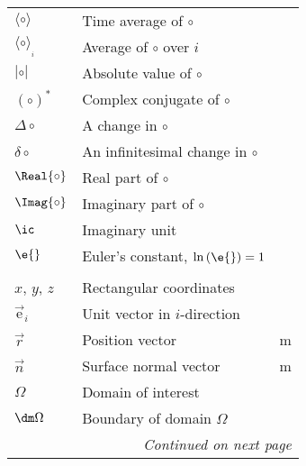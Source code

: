 \begin{center}
\begin{tabular}{p{2cm}p{8cm}p{3cm}}
$\langle\circ\rangle$       & Time average of $\circ$						& \SI{}{} \\
$\langle\circ\rangle_{_i}$  & Average of $\circ$ over $i$					& \SI{}{} \\
$|\circ|$       			& Absolute value of $\circ$						& \SI{}{} \\
$(\circ)^*$       			& Complex conjugate of $\circ$					& \SI{}{} \\
$\Delta\circ$       		& A change in $\circ$							& \SI{}{} \\
$\delta\circ$       		& An infinitesimal change in $\circ$			& \SI{}{} \\
$\Real{\circ}$       		& Real part of $\circ$							& \SI{}{} \\
$\Imag{\circ}$       		& Imaginary part of $\circ$						& \SI{}{} \\
$\ic$                     	& Imaginary unit								& \SI{}{} \\
$\e{}$                     	& Euler's constant, $\ln{(\e{})}=1$				& \SI{}{} \\\\

$x$, $y$, $z$               & Rectangular coordinates						& \SI{}{} \\
$\vec{\mathrm{e}}_i$        & Unit vector in $i$-direction					& \SI{}{} \\
$\vec{r}$		   	  		& Position vector								& \SI{m}{} \\
$\vec{n}$		   	  		& Surface normal vector							& \SI{m}{} \\	
$\Omega$		        	& Domain of interest							& \SI{}{} \\
$\dm\Omega$		        	& Boundary of domain $\Omega$					& \SI{}{} \\
\hline
							& \multicolumn{2}{r}{\textit{Continued on next page}}		
\end{tabular}
\end{center}



